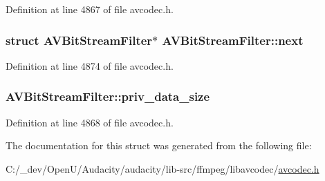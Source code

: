 Definition at line 4867 of file avcodec.\+h.

\subsubsection[{\texorpdfstring{next}{next}}]{\setlength{\rightskip}{0pt plus 5cm}struct {\bf A\+V\+Bit\+Stream\+Filter}$\ast$ A\+V\+Bit\+Stream\+Filter\+::next}\hypertarget{struct_a_v_bit_stream_filter_a4bdb343a6dc2a6031a8fed27bc60d022}{}\label{struct_a_v_bit_stream_filter_a4bdb343a6dc2a6031a8fed27bc60d022}


Definition at line 4874 of file avcodec.\+h.

\subsubsection[{\texorpdfstring{priv\+\_\+data\+\_\+size}{priv_data_size}}]{ A\+V\+Bit\+Stream\+Filter\+::priv\+\_\+data\+\_\+size}\hypertarget{struct_a_v_bit_stream_filter_abf78eca41afed22f479532dbfb2f8ec6}{}\label{struct_a_v_bit_stream_filter_abf78eca41afed22f479532dbfb2f8ec6}


Definition at line 4868 of file avcodec.\+h.



The documentation for this struct was generated from the following file\+:\begin{DoxyCompactItemize}
\item 
C\+:/\+\_\+dev/\+Open\+U/\+Audacity/audacity/lib-\/src/ffmpeg/libavcodec/\hyperlink{avcodec_8h}{avcodec.\+h}\end{DoxyCompactItemize}
